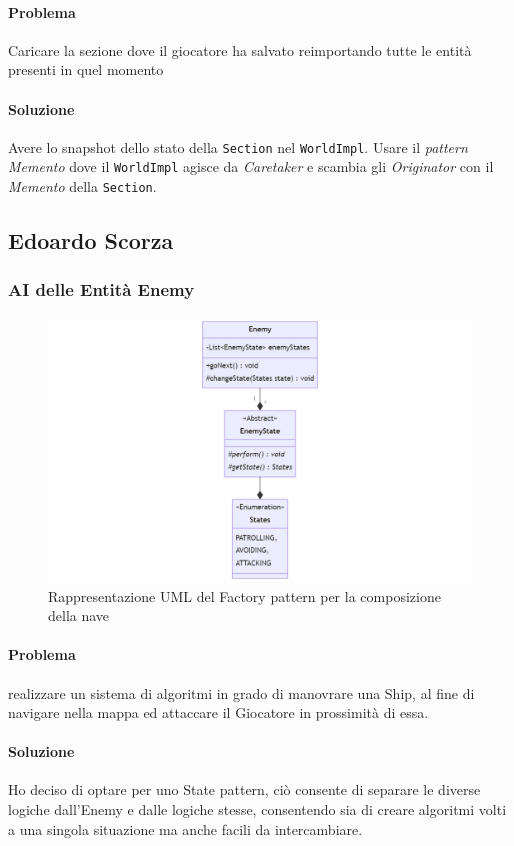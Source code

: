 \documentclass[a4paper,12pt]{report}
\begin{document}
\paragraph{Problema} Caricare la sezione dove il giocatore ha salvato reimportando tutte le entità presenti in quel momento
\paragraph{Soluzione} Avere lo snapshot dello stato della \texttt{Section} nel \texttt{WorldImpl}. Usare il \textit{pattern Memento} dove il \texttt{WorldImpl} agisce da \textit{Caretaker} e scambia gli \textit{Originator} con il \textit{Memento} della \texttt{Section}.

\subsection*{Edoardo Scorza}
\subsubsection*{AI delle Entità Enemy}
\begin{figure}[H]
	\centering{}
	\includegraphics[width=\textwidth]{img/Enemy.png}
	\caption{Rappresentazione UML del Factory pattern per la composizione della nave}
	\label{img:Enemy}
\end{figure}
\paragraph{Problema} realizzare un sistema di algoritmi in grado di manovrare una Ship, al fine di navigare nella mappa ed attaccare il Giocatore in prossimità di essa.
\paragraph{Soluzione} Ho deciso di optare per uno State pattern, ciò consente di separare le diverse logiche dall'Enemy e dalle logiche stesse, consentendo sia di creare algoritmi volti a una singola situazione ma anche facili da intercambiare.
\end{document}
